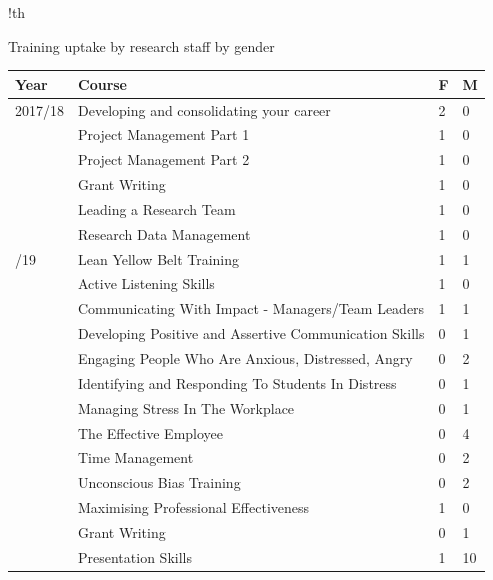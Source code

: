 
\begin{tabbox}{!th}
    
\caption{Training uptake by research staff by gender}
\label{tab:training:postdoc}
\footnotesize 

\begin{tabular}{p{1.5cm}
                p{9.5cm}
                R{1cm}
                R{1cm}}
    
    \toprule 
    Year & Course & F & M \\
    \midrule
    
    2017/18 & Developing and consolidating your career & 2 & 0\\
    & Project Management Part 1 & 1 & 0 \\
    & Project Management Part 2 & 1 & 0 \\
    & Grant Writing & 1 & 0 \\
    & Leading a Research Team & 1 & 0 \\
    & Research Data Management & 1 & 0 \\
    /19  & Lean Yellow Belt Training & 1 & 1 \\
    & Active Listening Skills & 1 & 0 \\
    & Communicating With Impact - Managers/Team Leaders & 1 & 1 \\
    & Developing Positive and Assertive Communication Skills & 0 & 1 \\
    & Engaging People Who Are Anxious, Distressed, Angry & 0 & 2 \\
    & Identifying and Responding To Students In Distress & 0 & 1 \\
    & Managing Stress In The Workplace & 0 & 1 \\
    & The Effective Employee & 0 & 4 \\
    & Time Management & 0 & 2 \\
    & Unconscious Bias Training & 0 & 2 \\
    & Maximising Professional Effectiveness & 1 & 0 \\
    & Grant Writing & 0 & 1 \\
    & Presentation Skills & 1 & 10\\

\end{tabular}
\end{tabbox}
